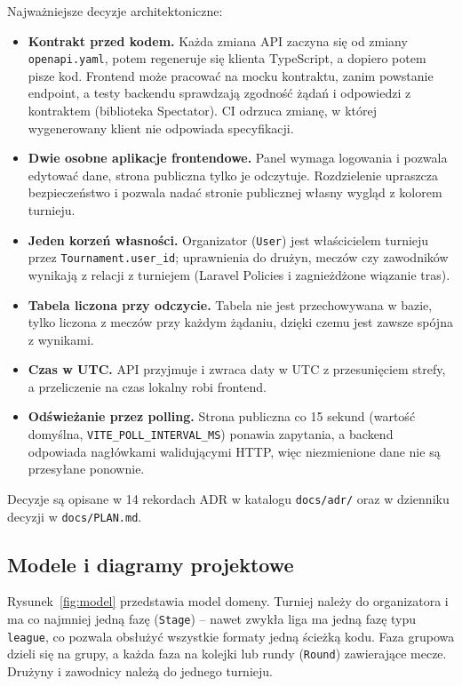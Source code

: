 \documentclass[11pt,a4paper,oneside]{article}
\newif\ifpodpowiedzi
\newcommand{\podpowiedz}[1]{\ifpodpowiedzi\par\begingroup\small\color{hintcolor}\textit{Wskazówka: #1}\par\endgroup\fi}
\begin{document}
Najważniejsze decyzje architektoniczne:
\begin{itemize}
\item \textbf{Kontrakt przed kodem.} Każda zmiana API zaczyna się od zmiany \texttt{openapi.yaml}, potem regeneruje się klienta TypeScript, a dopiero potem pisze kod. Frontend może pracować na mocku kontraktu, zanim powstanie endpoint, a testy backendu sprawdzają zgodność żądań i odpowiedzi z kontraktem (biblioteka Spectator). CI odrzuca zmianę, w której wygenerowany klient nie odpowiada specyfikacji.
\item \textbf{Dwie osobne aplikacje frontendowe.} Panel wymaga logowania i pozwala edytować dane, strona publiczna tylko je odczytuje. Rozdzielenie upraszcza bezpieczeństwo i pozwala nadać stronie publicznej własny wygląd z kolorem turnieju.
\item \textbf{Jeden korzeń własności.} Organizator (\texttt{User}) jest właścicielem turnieju przez \texttt{Tournament.user\_id}; uprawnienia do drużyn, meczów czy zawodników wynikają z relacji z turniejem (Laravel Policies i zagnieżdżone wiązanie tras).
\item \textbf{Tabela liczona przy odczycie.} Tabela nie jest przechowywana w bazie, tylko liczona z meczów przy każdym żądaniu, dzięki czemu jest zawsze spójna z wynikami.
\item \textbf{Czas w UTC.} API przyjmuje i zwraca daty w UTC z przesunięciem strefy, a przeliczenie na czas lokalny robi frontend.
\item \textbf{Odświeżanie przez polling.} Strona publiczna co 15 sekund (wartość domyślna, \texttt{VITE\_POLL\_INTERVAL\_MS}) ponawia zapytania, a backend odpowiada nagłówkami walidującymi HTTP, więc niezmienione dane nie są przesyłane ponownie.
\end{itemize}
Decyzje są opisane w 14 rekordach ADR w katalogu \texttt{docs/adr/} oraz w dzienniku decyzji w \texttt{docs/PLAN.md}.

\subsection{Modele i diagramy projektowe}
\podpowiedz{Dobierz diagramy do projektu. Dla oprogramowania mogą to być diagramy UML: klas, przypadków użycia, sekwencji, stanów lub komponentów. Dla innych projektów wykorzystaj np. schemat sceny, storyboard lub diagram procesu. Każdy rysunek opatrz podpisem i omów w tekście, stosując odwołania przez \texttt{\textbackslash ref}. Nie twórz diagramów wyłącznie w celu wypełnienia szablonu.}
Rysunek~\ref{fig:model} przedstawia model domeny. Turniej należy do organizatora i ma co najmniej jedną fazę (\texttt{Stage}) -- nawet zwykła liga ma jedną fazę typu \texttt{league}, co pozwala obsłużyć wszystkie formaty jedną ścieżką kodu. Faza grupowa dzieli się na grupy, a każda faza na kolejki lub rundy (\texttt{Round}) zawierające mecze. Drużyny i zawodnicy należą do jednego turnieju.
\end{document}

